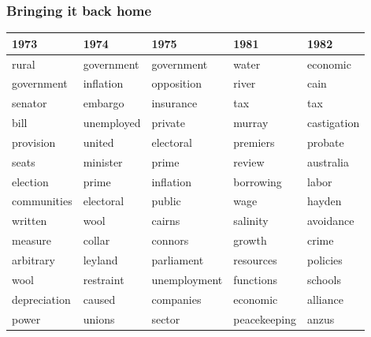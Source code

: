 \documentclass{beamer}       %
\begin{document}
\begin{frame}
\frametitle{Bringing it back home}
\begin{table}[h!]
\tiny
\begin{tabular}{lllll}

\toprule
\textbf{1973}         & \textbf{1974}       & \textbf{1975}         & \textbf{1981}         & \textbf{1982}        \\ \midrule
\cellcolor{red!25}rural        & \cellcolor{gray!25}government & \cellcolor{gray!25}government   & \cellcolor{yellow!25}water        & \cellcolor{orange!25}economic    \\
\cellcolor{gray!25}government   & \cellcolor{orange!25}inflation  & \cellcolor{gray!25}opposition   & \cellcolor{red!25}river        & cain        \\
\cellcolor{gray!25}senator      & embargo    & insurance    & \cellcolor{orange!25}tax          & \cellcolor{orange!25}tax         \\
\cellcolor{gray!25}bill         & \cellcolor{orange!25}unemployed & private      & \cellcolor{red!25}murray       & castigation \\
\cellcolor{gray!25}provision    & united     & \cellcolor{gray!25}electoral    & \cellcolor{gray!25}premiers     & probate     \\
\cellcolor{gray!25}seats        & \cellcolor{gray!25}minister   & \cellcolor{gray!25}prime        & review       & australia   \\
\cellcolor{gray!25}election     & \cellcolor{gray!25}prime      & \cellcolor{orange!25}inflation    & \cellcolor{orange!25}borrowing    & \cellcolor{gray!25}labor       \\
communities  & \cellcolor{gray!25}electoral  & public       & \cellcolor{orange!25}wage         & hayden      \\
written      & \cellcolor{red!25}wool       & cairns       & salinity     & avoidance   \\
measure      & collar     & connors      & growth       & crime       \\
arbitrary    & leyland    & \cellcolor{gray!25}parliament   & resources    & \cellcolor{gray!25}policies    \\
\cellcolor{red!25}wool      & restraint  & \cellcolor{orange!25}unemployment & functions    & schools     \\
depreciation & caused     & companies    & \cellcolor{orange!25}economic     & alliance    \\
power        & \cellcolor{red!25}unions     & sector       & \cellcolor{green!25}peacekeeping & \cellcolor{green!25}anzus        \\

\end{tabular}
\end{table}
\end{frame}
\end{document}
